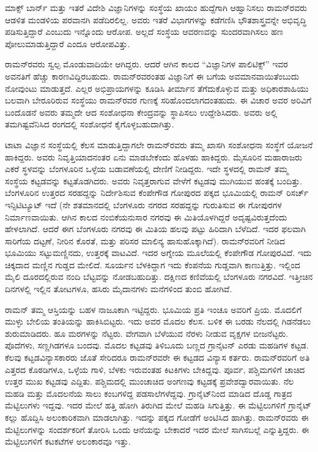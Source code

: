 \newpage

ಮಾಕ್ಸ್ ಬಾರ್ನ್ ಮತ್ತು ಇತರೆ ವಿದೇಶಿ ವಿಜ್ಞಾನಿಗಳನ್ನು ಸಂಸ್ಥೆಯ ಖಾಯಂ ಹುದ್ದೆಗಾಗಿ ಆಹ್ವಾನಿಸಲು ರಾಮನ್‍ರವರು ಆಡಳಿತ ಮಂಡಳಿಯ ಪರವಾನಗಿ ಪಡೆದಿರಲಿಲ್ಲ. ಅವರು ಇತರೆ ವಿಭಾಗಗಳನ್ನು ಕಡೆಗಣಿಸಿ ಭೌತಶಾಸ್ತ್ರವನ್ನೇ ಅಭಿವೃದ್ಧಿ ಪಡಿಸುತ್ತಿದ್ದಾರೆ ಎಂಬುದು ಇನ್ನೊಂದು ಆರೋಪ. ಅಲ್ಲದೆ ಸಂಸ್ಥೆಯ ಆವರಣವನ್ನು ಸುಂದರವಾಗಿಸಲು ಹಣ ಪೋಲುಮಾಡುತ್ತಿದ್ದಾರೆ ಎಂದೂ ಆರೋಪವಿತ್ತು.

ರಾಮನ್‍ರವರು ಸ್ವಲ್ಪ ಮೊಂಡುವಾದಿಯೇ ಆಗಿದ್ದರು. ಆದರೆ ಆಗಿನ ಕಾಲದ “ವಿಜ್ಞಾನಿಗಳ ಪಾಲಿಟಿಕ್ಸ್” ಇವರ ಅವನತಿಗೆ ಹೆಚ್ಚು ಕಾರಣವಿದ್ದಿರಬಹುದು. ರಾಮನ್‍ರವರಂತಹ ವಿಜ್ಞಾನಿಗೆ ಈ ಬಗೆಯ ಅವಮಾನವಾಯಿತೆಂಬುದು ನೋವುಂಟು ಮಾಡುತ್ತದೆ. ಎಲ್ಲರ ಅಭಿಪ್ರಾಯಗಳನ್ನು ಕೂಡಿಸಿ ತೀರ್ಮಾನ ತೆಗೆದುಕೊಳ್ಳುವ ಮತ್ತು ಅಧಿಕಾರಶಾಹಿಯು ಬಲವಾಗಿ ಬೇರೂರಿರುವ ಸಂಸ್ಥೆಯು ರಾಮನ್‍ರವರ ಗುಣಕ್ಕೆ ಸರಿಹೊಂದಲಾಗದಂತಹುದು. ಈ ವಿಚಾರ ಅವರ ಅರಿವಿಗೆ ಬಂದೊಡನೆ ಅವರು ತಮ್ಮದೇ ಆದ ಸಂಶೋಧನಾ ಕೇಂದ್ರವನ್ನು ಸ್ಥಾಪಿಸಲು ಉದ್ದೇಶಿಸಿದರು. ಅವರು ಅಲ್ಲಿ ತಮಗಿಷ್ಟವೆನಿಸಿದ ರಂಗದಲ್ಲಿ ಸಂಶೋಧನೆ ಕೈಗೊಳ್ಳಬಹುದಾಗಿತ್ತು.



ಟಾಟಾ ವಿಜ್ಞಾನ ಸಂಸ್ಥೆಯಲ್ಲಿ ಕೆಲಸ ಮಾಡುತ್ತಿದ್ದಾಗಲೇ ರಾಮನ್‍ರವರು ತಮ್ಮ ಖಾಸಗಿ ಸಂಶೋಧನಾ ಸಂಸ್ಥೆಗೆ ಯೋಜನೆ ಹಾಕಿದ್ದರು. ಅವರು ನಿವೃತ್ತಿಯಾದನಂತರ ಏನು ಮಾಡಬೇಕೆಂದು ಹೊಳಹು ಹಾಕಿದ್ದರು. ಮೈಸೂರಿನ ಮಹಾರಾಜರು  ಎಕರೆ ಸ್ಥಳವನ್ನು ಬೆಂಗಳೂರಿನ ಒಳ್ಳೆಯ ಬಡಾವಣೆಯಲ್ಲಿ ದೇಣಿಗೆ ನೀಡಿದ್ದರು. ಇದೇ ಸ್ಥಳದಲ್ಲಿ ರಾಮನ್ ತಮ್ಮ ಸಂಸ್ಥೆಯ ಕಟ್ಟಡವನ್ನು ಕಟ್ಟತೊಡಗಿದರು. ಅವರು ನಿವೃತ್ತರಾಗುವ ವೇಳೆಗೆ ಕಟ್ಟಡವು ಮುಗಿಯುವ ಹಂತಕ್ಕೆ ಬಂದಿತ್ತು. ಬೆಂಗಳೂರಿನ ಉತ್ತರದ ಸರಹದ್ದನ್ನು ನಿರ್ದೇಶಿಸುವ ಕೆಂಪೇಗೌಡ ಗೋಪುರದ ಪಕ್ಕದ ಭೂಮಿಯಲ್ಲಿ ರಾಮನ್ ರಿಸರ್ಚ್ ಇನ್ಸಿಟಿಟ್ಯೂಟ್ ಇದೆ (ನೇ ಶತಮಾನದಲ್ಲಿ ಬೆಂಗಳೂರು ನಗರದ ಸರಹದ್ದನ್ನು ಗುರುತಿಸುವ ಈ ಗೋಪುರಗಳ ನಿರ್ಮಾಣವಾಯಿತು. ಆಗಿನ ಕಾಲದ ನಂಬಿಕೆಯನುಸಾರ ನಗರವು ಈ ಮಿತಿಯೊಳಗಿದ್ದರೆ ಅದೃಷ್ಟವಿರುತ್ತದೆಂದು ಹೇಳಲಾಗಿದೆ. ಆದರೆ ಈಗ ಬೆಂಗಳೂರು ನಗರವು ಈ ಮಿತಿಯ ಹಲವು ಪಟ್ಟು ಹಿರಿದಾಗಿ ಬೆಳೆದಿದೆ. ಇದರ ಫಲವಾಗಿ ಸಾರಿಗೆಯ ದಟ್ಟಣೆ, ನೀರಿನ ಕೊರತೆ, ಮತ್ತು ಪರಿಸರ ಮಾಲಿನ್ಯ ಹಾಸುಹೊಕ್ಕಾಗಿದೆ). ರಾಮನ್‍ರವರಿಗೆ ನೀಡಿದ ಭೂಮಿಯು ಸಟ್ಟುಮಣ್ಣಿನದು, ಉತ್ತರಕ್ಕೆ ವಾಟವಿದೆ. ಇದರ ಅಗ್ನೇಯ ಮೂಲೆಯಲ್ಲಿ ಕೆಂಪೇಗೌಡ ಗೋಪುರವಿದೆ. ಇದು ಚಿಕ್ಕದಾದ ಮಣ್ಣಿನ ಗುಡ್ಡದ ಮೇಲಿದೆ. ಸೂರ್ಯನ ಬೆಳಕಿದ್ದಾಗ ಇದು ಕೆಂಪನೆಯ ಗುಡ್ಡವಾಗಿ ಕಾಣುತ್ತಿತ್ತು. ಇಲ್ಲಿಂದ ಮೈಲಿ ದೂರದಲ್ಲಿರುವ ನಂದಿ ಬೆಟ್ಟವನ್ನು ನೋಡಬಹುದಿತ್ತು. ದಕ್ಷಿಣದ ಕಣಿವೆಯಲ್ಲಿ ಬೆಂಗಳೂರು ನಗರವಿದೆ. ಇತ್ತೀಚಿನ ದಿನಗಳಲ್ಲಿ ಇಲ್ಲಿನ ತೋಟಗಳೂ, ಹಸಿರು ಮೈದಾನಗಳು ಮನೆಗಳಿಂದ ತುಂಬಿ ಹೋಗಿವೆ.

ರಾಮನ್ ತಮ್ಮ ಆಸ್ತಿಯನ್ನು ಬಹಳ ನಾಜೂಕಾಗಿ ಇಟ್ಟಿದ್ದರು. ಭೂಮಿಯ ಪ್ರತಿ ಇಂಚೂ ಅವರಿಗೆ ಪ್ರಿಯ. ಮೊದಲಿಗೆ ಮುಳ್ಳು ಬೇಲಿಯ ತಂತಿಯನ್ನು ಹಾಕಿಸಿಬಿಟ್ಟರು. ಇದು ಅವರ ಮೊದಲ ಕೆಲಸ. ಬಳಿಕ ಈ ಬರಡು ನೆಲದಲ್ಲಿ ಗಿಡನೆಡಲು ಶುರುಮಾಡಿದರು. ಹೂ ಮರಗಳನ್ನು ನೆಟ್ಟರು. ವೇಗವಾಗಿ ಬೆಳೆಯುವ ನೆರಳು ನೀಡುವ ವೃಕ್ಷಗಳ ಬೀಜನೆಟ್ಟರು. ಪೊದೆಗಳು, ಸಣ್ಣಗಿಡಗಳೂ ಬಂದವು. ಮೊದಲ ಕಟ್ಟಡವು ತಿಳಿಬೂದು ಬಣ್ಣದ ಗ್ರಾನೈಟನ್ ಎರಡು ಮಹಡಿಗಳ ಕಟ್ಟಡ. ಕೆಲವು ಕಟ್ಟಡವಿನ್ಯಾಸಕಾರರು ಜೊತೆ ಸೇರಿದರೂ ರಾಮನ್‍ರವರೇ ಈ ಕಟ್ಟಡದ ವಿನ್ಯಾಸ ಕರ್ತರು. ರಾಮನ್‍ರವರಿಗೆ ಅತಿ ಎತ್ತರದ ಕೊಠಡಿಗಳೂ, ಒಳ್ಳೆಯ ಗಾಳಿ, ಬೆಳಕು ಇರುವಂತಹ ಕಿಟಕಿಗಳು ಬೇಕಿದ್ದವು. ಪೂರ್ವ, ಪಶ್ಚಿಮಗಳಿಗೆ ಚಾಚಿದ ಉತ್ತರ ಮುಖ ಕಟ್ಟಡವು ಎದ್ದಿತು. ಪಶ್ಚಿಮದಲ್ಲಿ ಮುಂಚಾಚಿದ ಅಂಗಣವು ಕಟ್ಟಡಕ್ಕೆ ಪ್ರವೇಶದ್ವಾರವಾಯಿತು. ನೆಲ ಮಹಡಿ ಮತ್ತು ಮೊದಲನೆಯ ಸಾಲು ಕಂಬಗಳಿದ್ದ ಪಡಸಾಲೆಗಳೆದ್ದವು. ಗ್ರಾನೈಟ್‍ನಿಂದ ಮಾಡಿದ ದೊಡ್ಡ ಗಾತ್ರದ ಮೆಟ್ಟಿಲುಗಳು ಇದ್ದವು. ಇದರ ಮೇಲೆ ಹತ್ತಿ ಹೋಗಿ  ತಿರುಗಿದ ಮೇಲೆ ಮಹಡಿ ಸಿಗುತ್ತಿತ್ತು. ಈ ಮೆಟ್ಟಿಲುಗಳಿಗೆ ಗ್ರಾನೈಟ್ ಕಲ್ಲು ಹೊದ್ದಿಸಿ ಅಲಂಕಾರಿಕವಾಗಿ ಮಾಡಲಾಗಿತ್ತು. ಇದನ್ನು ಪಕ್ಕದ ಗೋಡೆಗೆ ಅಂಟಿಸಿದ ಹಾಗಿತ್ತು. ರಾಮನ್‍ರವರು ಈ ಮೆಟ್ಟಿಲುಗಳನ್ನು ಸಂದರ್ಶಕರಿಗೆ ತೋರಿಸಿ ಒಂದು ಆನೆಯನ್ನು ಬೇಕಾದರೆ ಇದರ ಮೇಲೆ ಸಾಗಿಸಬಲ್ಲೆ ಎನ್ನುತ್ತಿದ್ದರು. ಈ ಮೆಟ್ಟಿಲುಗಳಿಗೆ ಕಟಕಟೆಗಳ ಅಲಂಕಾರವೂ ಇತ್ತು. 


